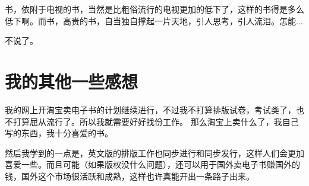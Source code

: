 \documentclass[11pt,oneside]{article}
\begin{document}
\begin{common-format}
书，依附于电视的书，当然是比粗俗流行的电视更加的低下了，这样的书得是多么低下啊。而书，高贵的书，自当独自撑起一片天地，引人思考，引人流泪。怎能...

不说了。


\section{我的其他一些感想}
我的网上开淘宝卖电子书的计划继续进行，不过我不打算排版试卷，考试类了，也不打算屈从流行了。所以我就需要好好找份工作。 那么淘宝上卖什么了，我自己写的东西，我十分喜爱的书。 

然后我学到的一点是，英文版的排版工作也同步进行和同步发行，这样人们会更加喜爱一些。而且可能（如果版权没什么问题），还可以用于国外卖电子书赚国外的钱，国外这个市场很活跃和成熟，这样也许真能开出一条路子出来。


\end{common-format}
\end{document}
